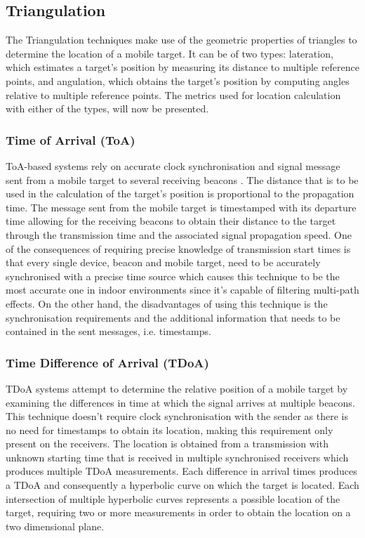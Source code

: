 \subsection{Triangulation} 
\label{subsec:tri} 
 

 
The Triangulation techniques make use of the geometric properties of triangles to determine the location of a mobile target. It can be of two types: lateration, which estimates a target's position by measuring its distance to multiple reference points, and angulation, which obtains the target's position by computing angles relative to multiple reference points. The metrics used for location calculation with either of the types, will now be presented. 



\subsubsection{Time of Arrival (ToA) } 
\label{subsubsec:toa} 
 
 
\ac{ToA}-based systems rely on accurate clock synchronisation and signal message sent from a mobile target to several receiving beacons \cite{locationtechniques}. The distance that is to be used in the calculation of the target's position is proportional to the propagation time. The message sent from the mobile target is timestamped with its departure time allowing for the receiving beacons to obtain their distance to the target through the transmission time and the associated signal propagation speed. 
One of the consequences of requiring precise knowledge of transmission start times is that every single device, beacon and mobile target, need to be accurately synchronised with a precise time source which causes this technique to be the most accurate one in indoor environments since it's capable of filtering multi-path effects. On the other hand, the disadvantages of using this technique is the synchronisation requirements and the additional information that needs to be contained in the sent messages, i.e. timestamps.  
 
 
 
 
\subsubsection{Time Difference of Arrival (TDoA) } 
\label{subsubsec:tdoa} 
 
 
\ac{TDoA} systems attempt to determine the relative position of a mobile target by examining the differences in time at which the signal arrives at multiple beacons\cite{TDoA}. This technique doesn't require clock synchronisation with the sender as there is no need for timestamps to obtain its location, making this requirement only present on the receivers. The location is obtained from a transmission with unknown starting time that is received in multiple synchronised receivers which produces multiple \ac{TDoA} measurements. Each difference in arrival times produces a \ac{TDoA} and consequently a hyperbolic curve on which the target is located. Each intersection of multiple hyperbolic curves represents a possible location of the target, requiring two or more measurements in order to obtain the location on a two dimensional plane. 
 
